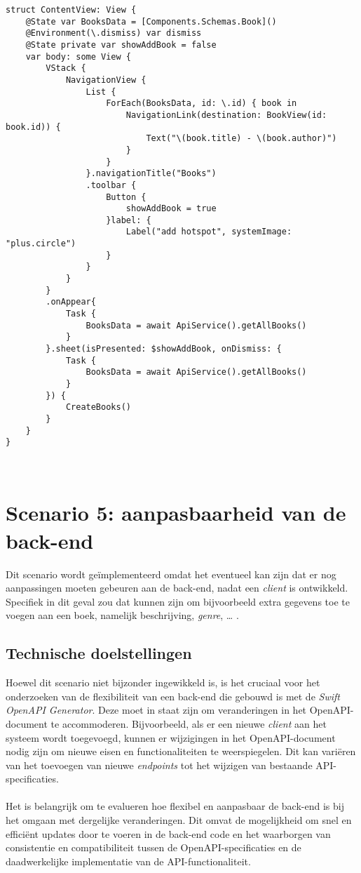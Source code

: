 \begin{lstlisting}[caption=ApiService file]
struct ContentView: View {
    @State var BooksData = [Components.Schemas.Book]()
    @Environment(\.dismiss) var dismiss
    @State private var showAddBook = false
    var body: some View {
        VStack {
            NavigationView {
                List {
                    ForEach(BooksData, id: \.id) { book in
                        NavigationLink(destination: BookView(id: book.id)) {
                            Text("\(book.title) - \(book.author)")
                        }
                    }
                }.navigationTitle("Books")
                .toolbar {
                    Button {
                        showAddBook = true
                    }label: {
                        Label("add hotspot", systemImage: "plus.circle")
                    }
                }
            }
        }
        .onAppear{
            Task {
                BooksData = await ApiService().getAllBooks()
            }
        }.sheet(isPresented: $showAddBook, onDismiss: {
            Task {
                BooksData = await ApiService().getAllBooks()
            }
        }) {
            CreateBooks()
        }
    }
}

    
\end{lstlisting}
 \newpage
 
\section{Scenario 5: aanpasbaarheid van de back-end}
Dit scenario wordt geïmplementeerd omdat het eventueel kan zijn dat er nog aanpassingen moeten gebeuren aan de back-end, nadat een \textit{client} is ontwikkeld. 
Specifiek in dit geval zou dat kunnen zijn om bijvoorbeeld extra gegevens toe te voegen aan een boek, namelijk beschrijving, \textit{genre}, … . 


\subsection{Technische doelstellingen}
Hoewel dit scenario niet bijzonder ingewikkeld is, is het cruciaal voor het onderzoeken van de flexibiliteit van een back-end die gebouwd is met de \textit{Swift OpenAPI Generator}. Deze moet in staat zijn om veranderingen in het OpenAPI-document te accommoderen. Bijvoorbeeld, als er een nieuwe \textit{client} aan het systeem wordt toegevoegd, kunnen er wijzigingen in het OpenAPI-document nodig zijn om nieuwe eisen en functionaliteiten te weerspiegelen. Dit kan variëren van het toevoegen van nieuwe \textit{endpoints} tot het wijzigen van bestaande API-specificaties.
\\ \\
Het is belangrijk om te evalueren hoe flexibel en aanpasbaar de back-end is bij het omgaan met dergelijke veranderingen. Dit omvat de mogelijkheid om snel en efficiënt updates door te voeren in de back-end code en het waarborgen van consistentie en compatibiliteit tussen de OpenAPI-specificaties en de daadwerkelijke implementatie van de API-functionaliteit.

